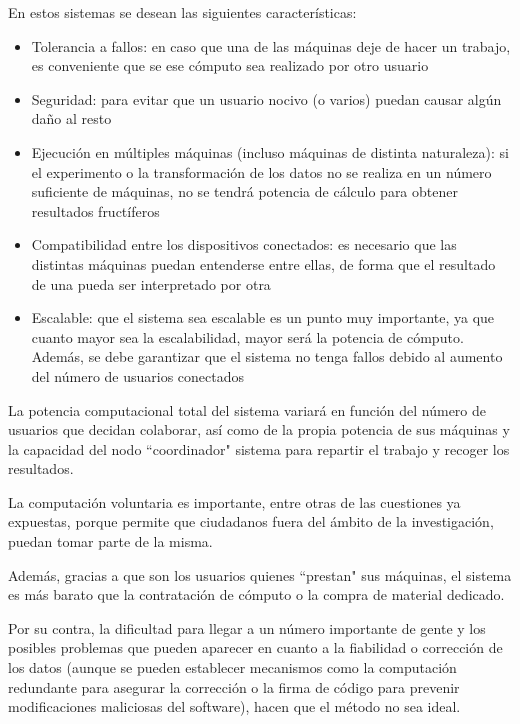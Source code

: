 \documentclass[runningheads,a4paper]{llncs}
\begin{document}
En estos sistemas se desean las siguientes caracter\'isticas:
\begin{itemize}
  \item Tolerancia a fallos: en caso que una de las m\'aquinas deje de hacer un trabajo, es
  conveniente que se ese c\'omputo sea realizado por otro usuario
  \item Seguridad: para evitar que un usuario nocivo (o varios) puedan causar alg\'un da\~no
  al resto
  \item Ejecuci\'on en m\'ultiples m\'aquinas (incluso m\'aquinas de distinta naturaleza):
  si el experimento o la transformaci\'on de los datos no se realiza en un n\'umero suficiente
  de m\'aquinas, no se tendr\'a potencia de c\'alculo para obtener resultados fruct\'iferos
  \item Compatibilidad entre los dispositivos conectados: es necesario que
  las distintas m\'aquinas puedan entenderse entre ellas, de forma que el resultado
  de una pueda ser interpretado por otra
  \item Escalable: que el sistema sea escalable es un punto muy importante, ya que
  cuanto mayor sea la escalabilidad, mayor ser\'a la potencia de c\'omputo. Adem\'as,
  se debe garantizar que el sistema no tenga fallos debido al aumento del n\'umero de
  usuarios conectados
\end{itemize}

La potencia computacional total del sistema variar\'a en funci\'on del n\'umero de
usuarios que decidan colaborar, as\'i como de la propia potencia de sus m\'aquinas
y la capacidad del nodo ``coordinador" sistema para repartir el trabajo
y recoger los resultados.

La computaci\'on voluntaria es importante, entre otras de las cuestiones ya expuestas,
porque permite que ciudadanos fuera del \'ambito de la investigaci\'on, puedan
tomar parte de la misma.

Adem\'as, gracias a que son los usuarios quienes ``prestan" sus m\'aquinas, el sistema
es m\'as barato que la contrataci\'on de c\'omputo o la compra de material dedicado.

Por su contra, la dificultad para llegar a un n\'umero importante de gente y los posibles
problemas que pueden aparecer en cuanto a la fiabilidad o correcci\'on de los datos
(aunque se pueden establecer mecanismos como la computaci\'on redundante
para asegurar la correcci\'on o la firma de c\'odigo para prevenir modificaciones maliciosas
del software), hacen que el m\'etodo no sea ideal.
\end{document}
